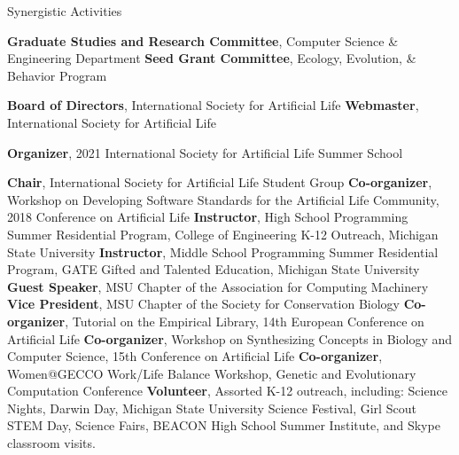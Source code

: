\begin{rubric}{Synergistic Activities}

\entry*[2020 -- Present] \textbf{Graduate Studies and Research Committee}, Computer Science \& Engineering Department
\entry*[2020 -- Present] \textbf{Seed Grant Committee}, Ecology, Evolution, \& Behavior Program

%
\entry*[2019 -- Present] \textbf{Board of Directors}, International Society for Artificial Life 
\entry*[2019 -- Present] \textbf{Webmaster}, International Society for Artificial Life 

\entry*[2021] \textbf{Organizer}, 2021 International Society for Artificial Life Summer School

\entry*[2016 -- 2019] \textbf{Chair}, International Society for Artificial Life Student Group 
%
\entry*[2018] \textbf{Co-organizer}, Workshop on Developing Software Standards for the Artificial Life Community, 2018 Conference on Artificial Life
%
\entry*[2017, 2018] \textbf{Instructor}, High School Programming Summer Residential Program, College of Engineering K-12 Outreach, Michigan State University
%
\entry*[2018] \textbf{Instructor}, Middle School Programming Summer Residential Program, GATE Gifted and Talented Education, Michigan State University
%
\entry*[2016 -- 2018] \textbf{Guest Speaker}, MSU Chapter of the Association for Computing Machinery
%
\entry*[2015 -- 2017] \textbf{Vice President}, MSU Chapter of the Society for Conservation Biology 
%
\entry*[2017] \textbf{Co-organizer}, Tutorial on the Empirical Library, 14th European Conference on Artificial Life
%
\entry*[2016] \textbf{Co-organizer}, Workshop on Synthesizing Concepts in Biology and Computer Science, 15th Conference on Artificial Life 
%
\entry*[2015] \textbf{Co-organizer}, Women@GECCO Work/Life Balance Workshop, Genetic and Evolutionary Computation Conference 
%
\entry*[2014 -- Present] \textbf{Volunteer}, Assorted K-12 outreach, including: Science Nights, Darwin Day, Michigan State University Science Festival, Girl Scout STEM Day, Science Fairs, BEACON High School Summer Institute, and Skype classroom visits.  
%
\\



\end{rubric}
